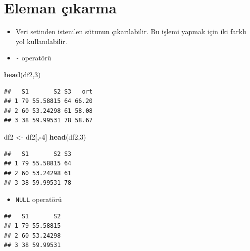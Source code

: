 \documentclass[
  oneside]{book}
\newenvironment{Shaded}{\begin{snugshade}}{\end{snugshade}}
\newcommand{\ConstantTok}[1]{\textcolor[rgb]{0.56,0.35,0.01}{#1}}
\newcommand{\DecValTok}[1]{\textcolor[rgb]{0.00,0.00,0.81}{#1}}
\newcommand{\FunctionTok}[1]{\textcolor[rgb]{0.13,0.29,0.53}{\textbf{#1}}}
\newcommand{\NormalTok}[1]{#1}
\newcommand{\OtherTok}[1]{\textcolor[rgb]{0.56,0.35,0.01}{#1}}
\newcommand{\SpecialCharTok}[1]{\textcolor[rgb]{0.81,0.36,0.00}{\textbf{#1}}}
\providecommand{\tightlist}{%
  \setlength{\itemsep}{0pt}\setlength{\parskip}{0pt}}
\begin{document}
\hypertarget{eleman-uxe7ux131karma}{%
\section{Eleman çıkarma}\label{eleman-uxe7ux131karma}}

\begin{itemize}
\item
  Veri setinden istenilen sütunun çıkarılabilir. Bu işlemi yapmak için iki farklı yol kullanılabilir.
\item
  \texttt{-} operatörü
\end{itemize}

\begin{Shaded}
\begin{Highlighting}[]
\FunctionTok{head}\NormalTok{(df2,}\DecValTok{3}\NormalTok{)}
\end{Highlighting}
\end{Shaded}

\begin{verbatim}
##   S1       S2 S3   ort
## 1 79 55.58815 64 66.20
## 2 60 53.24298 61 58.08
## 3 38 59.99531 78 58.67
\end{verbatim}

\begin{Shaded}
\begin{Highlighting}[]
\NormalTok{df2 }\OtherTok{\textless{}{-}}\NormalTok{ df2[,}\SpecialCharTok{{-}}\DecValTok{4}\NormalTok{] }
\FunctionTok{head}\NormalTok{(df2,}\DecValTok{3}\NormalTok{)}
\end{Highlighting}
\end{Shaded}

\begin{verbatim}
##   S1       S2 S3
## 1 79 55.58815 64
## 2 60 53.24298 61
## 3 38 59.99531 78
\end{verbatim}

\begin{itemize}
\tightlist
\item
  \texttt{NULL} operatörü
\end{itemize}

\begin{Shaded}
\end{Shaded}

\begin{verbatim}
##   S1       S2
## 1 79 55.58815
## 2 60 53.24298
## 3 38 59.99531
\end{verbatim}
\end{document}

